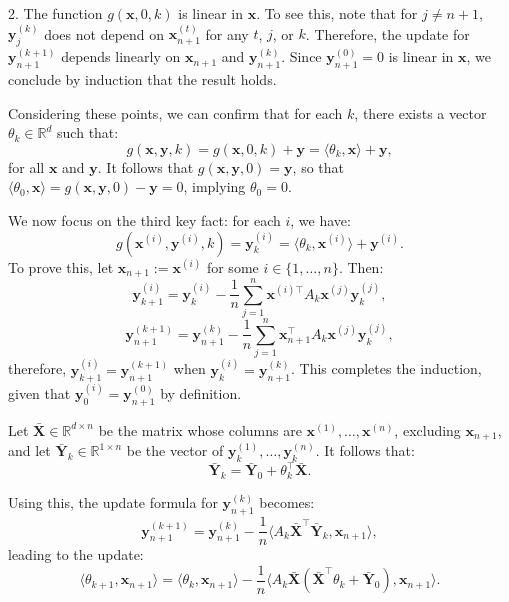 \documentclass[11pt]{article}
\theoremstyle{plain}
\theoremstyle{definition}
\theoremstyle{remark}
\numberwithin{equation}{section}
\begin{document}
2. The function \( g(\mathbf{x}, 0, k) \) is linear in \( \mathbf{x} \). To see this, note that for \( j \neq n+1 \), \( \mathbf{y}_j^{(k)} \) does not depend on \( \mathbf{x}_{n+1}^{(t)} \) for any \( t \), \( j \), or \( k \). Therefore, the update for \( \mathbf{y}_{n+1}^{(k+1)} \) depends linearly on \( \mathbf{x}_{n+1} \) and \( \mathbf{y}_{n+1}^{(k)} \). Since \( \mathbf{y}_{n+1}^{(0)} = 0 \) is linear in \( \mathbf{x} \), we conclude by induction that the result holds.

Considering these points, we can confirm that for each \( k \), there exists a vector \( \theta_k \in \mathbb{R}^d \) such that:
\[
g(\mathbf{x}, \mathbf{y}, k) = g(\mathbf{x}, 0, k) + \mathbf{y} = \langle \theta_k, \mathbf{x} \rangle + \mathbf{y},
\]
for all \( \mathbf{x} \) and \( \mathbf{y} \). It follows that \( g(\mathbf{x}, \mathbf{y}, 0) = \mathbf{y} \), so that \( \langle \theta_0, \mathbf{x} \rangle = g(\mathbf{x}, \mathbf{y}, 0) - \mathbf{y} = 0 \), implying \( \theta_0 = 0 \).

We now focus on the third key fact: for each \( i \), we have:
\[
g(\mathbf{x}^{(i)}, \mathbf{y}^{(i)}, k) = \mathbf{y}^{(i)}_k = \langle \theta_k, \mathbf{x}^{(i)} \rangle + \mathbf{y}^{(i)}.
\]
To prove this, let \( \mathbf{x}_{n+1} := \mathbf{x}^{(i)} \) for some \( i \in \{1, \dots, n\} \). Then:
\[
\mathbf{y}^{(i)}_{k+1} = \mathbf{y}^{(i)}_k - \frac{1}{n} \sum_{j=1}^{n} \mathbf{x}^{(i)\top} A_k \mathbf{x}^{(j)} \mathbf{y}^{(j)}_k,
\]
\[
\mathbf{y}_{n+1}^{(k+1)} = \mathbf{y}_{n+1}^{(k)} - \frac{1}{n} \sum_{j=1}^{n} \mathbf{x}_{n+1}^\top A_k \mathbf{x}^{(j)} \mathbf{y}^{(j)}_k,
\]
therefore, \( \mathbf{y}^{(i)}_{k+1} = \mathbf{y}_{n+1}^{(k+1)} \) when \( \mathbf{y}^{(i)}_k = \mathbf{y}_{n+1}^{(k)} \). This completes the induction, given that \( \mathbf{y}^{(i)}_0 = \mathbf{y}_{n+1}^{(0)} \) by definition.

Let \( \mathbf{\bar{X}} \in \mathbb{R}^{d \times n} \) be the matrix whose columns are \( \mathbf{x}^{(1)}, \dots, \mathbf{x}^{(n)} \), excluding \( \mathbf{x}_{n+1} \), and let \( \mathbf{\bar{Y}}_k \in \mathbb{R}^{1 \times n} \) be the vector of \( \mathbf{y}^{(1)}_k, \dots, \mathbf{y}^{(n)}_k \). It follows that:
\[
\mathbf{\bar{Y}}_k = \mathbf{\bar{Y}}_0 + \theta_k^\top \mathbf{\bar{X}}.
\]

Using this, the update formula for \( \mathbf{y}_{n+1}^{(k)} \) becomes:
\begin{equation}
\mathbf{y}_{n+1}^{(k+1)} = \mathbf{y}_{n+1}^{(k)} - \frac{1}{n} \langle A_k \mathbf{\bar{X}}^\top \mathbf{\bar{Y}}_k, \mathbf{x}_{n+1} \rangle,
\label{yn_update}
\end{equation}
leading to the update:
\begin{equation}
\langle \theta_{k+1}, \mathbf{x}_{n+1} \rangle = \langle \theta_k, \mathbf{x}_{n+1} \rangle - \frac{1}{n} \langle A_k \mathbf{\bar{X}} (\mathbf{\bar{X}}^\top \theta_k + \mathbf{\bar{Y}}_0), \mathbf{x}_{n+1} \rangle.
\label{thetak_xn_update}
\end{equation}
\end{document}
